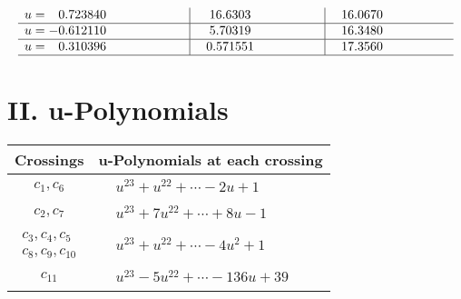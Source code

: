 \documentclass[1p]{elsarticle_modified}
\theoremstyle{definition}
\begin{document}
$$\begin{array}{c|c|c}
\begin{aligned}
u &= \phantom{-}0.723840\phantom{ +0.000000I}\end{aligned}
 & \phantom{-}16.6303\phantom{ +0.000000I} & \phantom{-}16.0670\phantom{ +0.000000I} \\ \hline\begin{aligned}
u &= -0.612110\phantom{ +0.000000I}\end{aligned}
 & \phantom{-}5.70319\phantom{ +0.000000I} & \phantom{-}16.3480\phantom{ +0.000000I} \\ \hline\begin{aligned}
u &= \phantom{-}0.310396\phantom{ +0.000000I}\end{aligned}
 & \phantom{-}0.571551\phantom{ +0.000000I} & \phantom{-}17.3560\phantom{ +0.000000I}\\
 \hline 
 \end{array}$$\newpage
\newpage\renewcommand{\arraystretch}{1}
\centering \section*{ II. u-Polynomials}
\begin{tabular}{m{50pt}|m{274pt}}
Crossings & \hspace{64pt}u-Polynomials at each crossing \\
\hline $$\begin{aligned}c_{1},c_{6}\end{aligned}$$&$\begin{aligned}
&u^{23}+u^{22}+\cdots-2 u+1
\end{aligned}$\\
\hline $$\begin{aligned}c_{2},c_{7}\end{aligned}$$&$\begin{aligned}
&u^{23}+7 u^{22}+\cdots+8 u-1
\end{aligned}$\\
\hline $$\begin{aligned}c_{3},c_{4},c_{5}\\c_{8},c_{9},c_{10}\end{aligned}$$&$\begin{aligned}
&u^{23}+u^{22}+\cdots-4 u^2+1
\end{aligned}$\\
\hline $$\begin{aligned}c_{11}\end{aligned}$$&$\begin{aligned}
&u^{23}-5 u^{22}+\cdots-136 u+39
\end{aligned}$\\
\hline
\end{tabular}\newpage\renewcommand{\arraystretch}{1}
\end{document}
